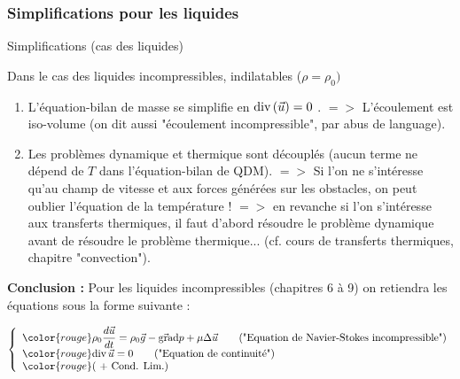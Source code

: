 \subsubsection{Simplifications pour les liquides}
\begin{frame}{Simplifications (cas des liquides)}
\small

Dans le cas des liquides incompressibles, indilatables ($\rho = \rho_0)$

\begin{enumerate} 
\pause
\item L'équation-bilan de masse se simplifie en $\mbox{\rm div}\, (\vec{u}) = 0$ .
\pause
$=>$ L'écoulement est iso-volume (on dit aussi "écoulement incompressible", par abus de language).
\pause
\item Les problèmes dynamique et thermique sont découplés (aucun terme ne dépend de $T$ dans l'équation-bilan de QDM).
\pause
$=>$ Si l'on ne s'intéresse qu'au champ de vitesse et aux forces générées sur les obstacles, on peut oublier l'équation de la température !
\pause
$=>$ en revanche si l'on s'intéresse aux transferts thermiques, il faut d'abord résoudre le problème dynamique avant de résoudre le problème thermique...
(cf. cours de transferts thermiques, chapitre "convection").

\end{enumerate}

\pause
\medskip

{\bf Conclusion :}  Pour les liquides incompressibles (chapitres 6 à 9) on retiendra les équations sous la forme suivante :



\begin{equation*}
\left\{
\begin{array}{l}
{\color{rouge}
\rho_0 \ddt{\myvec{u}}  = \rho_0  \myvec{g}  - \gradient p + \mu  \Delta \myvec{u}} 
\qquad \mbox{("Equation de Navier-Stokes incompressible")}
\\
{\color{rouge} \divergence \myvec{u} = 0} \qquad \mbox{("Equation de continuité")}
\\
\color{rouge} \mbox{( + Cond. Lim.)}
\end{array}
\right.
\end{equation*}

\end{frame}

